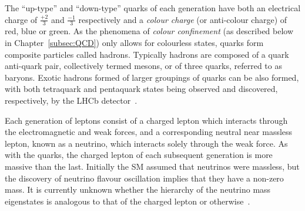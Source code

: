 The ``up-type'' and ``down-type'' quarks of each generation have both an electrical charge of $\frac{+2}{3}$ and $\frac{-1}{3}$  respectively and a \emph{colour charge} (or anti-colour charge) of red, blue or green.
As the phenomena of \emph{colour confinement} (as described below in Chapter~\ref{subsec:QCD}) only allows for colourless states, quarks form composite particles called hadrons.
Typically hadrons are composed of a quark anti-quark pair, collectively termed mesons, or of three quarks, referred to as baryons.
Exotic hadrons formed of larger groupings of quarks can be also formed, with both tetraquark and pentaquark states being observed and discovered, respectively, by the LHCb detector~\cite{Aaij:2014jqa,Aaij:2015tga}.

Each generation of leptons consist of a charged lepton which interacts through the electromagnetic and weak forces, and a corresponding neutral near massless lepton, known as a neutrino, which interacts solely through the weak force.
As with the quarks, the charged lepton of each subsequent generation is more massive than the last.
Initially the SM assumed that neutrinos were massless, but the discovery of neutrino flavour oscillation implies that they have a non-zero mass. 
It is currently unknown whether the hierarchy of the neutrino mass eigenstates is analogous to that of the charged lepton or otherwise~\cite{Nath:2018rqn}.

